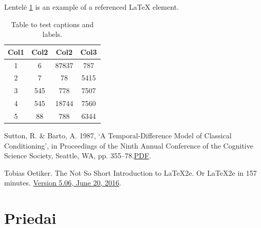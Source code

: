 \documentclass[a4paper, 12pt]{article}
\begin{document}
Lentelė \ref{lentele} is an example of a referenced \LaTeX{} element.

\begin{table}[h!]
\centering
\begin{tabular}{||c c c c||} 
 \hline
 Col1 & Col2 & Col2 & Col3 \\ [0.5ex] 
 \hline\hline
 1 & 6 & 87837 & 787 \\ 
 2 & 7 & 78 & 5415 \\
 3 & 545 & 778 & 7507 \\
 4 & 545 & 18744 & 7560 \\
 5 & 88 & 788 & 6344 \\ [1ex] 
 \hline
\end{tabular}
\caption{Table to test captions and labels.}
\label{lentele}
\end{table}


\newpage
{}


\begin{thebibliography}{99}

Sutton, R. \& Barto, A. 1987, ‘A Temporal-Difference Model of Classical Conditioning’, in Proceedings of the Ninth Annual Conference of the Cognitive Science Society, Seattle, WA, pp. 355–78.\href{http://incompleteideas.net/papers/sutton-barto-TD-87.pdf}{PDF}.

Tobias Oetiker. The Not So Short Introduction to \LaTeX2e{}. Or \LaTeX2e{} in 157 
minutes. \href{http://tobi.oetiker.ch/lshort/lshort.pdf}{Version 5.06, June 20, 2016}.

\end{thebibliography}
%
%
\newpage
\appendix
\section{Priedai}
\end{document}

